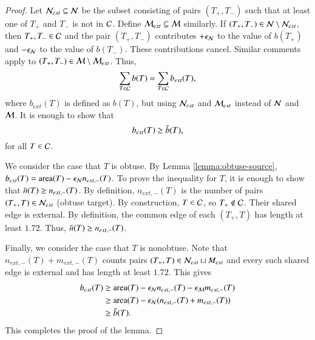 \begin{proof}
  Let $\mathcal N_{ext}\subseteq \mathcal N$ be the subset consisting of pairs
  $(T_+,T_-)$ such that at least one of $T_+$ and $T_-$ is not in
  $\mathcal C$.  Define $\mathcal M_{ext}\subseteq \mathcal M$ similarly.  If $(T_+,T_-)\in
  \mathcal N\setminus \mathcal N_{ext}$, then $T_+,T_-\in\mathcal C$ and the pair $(T_+,T_-)$
  contributes $+\epsilon_{\mathcal N}$ to the value of $b(T_+)$ and $-\epsilon_{\mathcal N}$ to the
  value of $b(T_-)$.  These contributions cancel.  Similar comments
  apply to $(T_+,T_-)\in\mathcal M\setminus \mathcal M_{ext}$.  Thus,
\[
\sum_{T\in \mathcal C} b(T) = \sum_{T\in \mathcal C} b_{ext}(T),
\]
where $b_{ext}(T)$ is defined as $b(T)$, but using $\mathcal N_{ext}$ and
$\mathcal M_{ext}$ instead of $\mathcal N$ and $\mathcal M$. It is enough to show that
\[
b_{ext}(T) \ge \bar b(T),
\]
for all $T\in\mathcal C$.

We consider the case that $T$ is obtuse.  By Lemma
\ref{lemma:obtuse-source}, $b_{ext}(T) = {\operatorname{area}}(T)-\epsilon_{\mathcal N} n_{ext,-}(T)$.
To prove the inequality for $T$, it is enough to show that $\bar n(T)\ge
n_{ext,-}(T)$.  By definition, $n_{ext,-}(T)$ is the number of pairs
$(T_+,T)\in\mathcal N_{ext}$ (obtuse target).  By construction, $T\in \mathcal C$, so
$T_+\not\in\mathcal C$.  Their shared edge is external.  By definition, the
common edge of each $(T_+,T)$ has length at least $1.72$.  Thus,
$\bar n(T)\ge n_{ext,-}(T)$.



  Finally, we consider the case that $T$ is nonobtuse.  Note that
  $n_{ext,-}(T)+m_{ext,-}(T)$ counts pairs $(T_+,T)\in\mathcal N_{ext}\sqcup
  M_{ext}$ and every such shared edge is external and has length at
  least $1.72$.  This gives
\begin{align*}
b_{ext}(T) &\ge {\operatorname{area}}(T) - \epsilon_{\mathcal N} n_{ext,-}(T) - \epsilon_{\mathcal M} m_{ext,-}(T) \\
&\ge {\operatorname{area}}(T) - \epsilon_{\mathcal N} (n_{ext,-}(T)+m_{ext,-}(T)) \\
&\ge \bar b(T).
\end{align*}
This completes the proof of the  lemma.
\end{proof}

